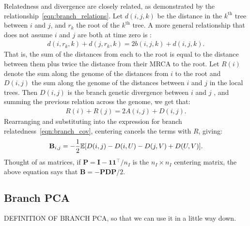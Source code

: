 Relatedness and divergence are closely related,
as demonstrated by the relationship~\eqref{eqn:branch_relations}.
%
Let $d(i,j,k)$ be the distance in the $k^\text{th}$ tree between $i$ and $j$,
and $r_k$ the root of the $k^\text{th}$ tree.
%
A more general relationship that does not assume $i$ and $j$ are both at time zero is
\citep{semple2003phylogenetics}:
%
\begin{align}
    d(i,r_k,k) + d(j,r_k,k) = 2 b(i,j,k) + d(i,j,k) .
\end{align}
%
That is, the sum of the distances from each to the root is
equal to the distance between them plus twice the distance from their MRCA to the root.
%
Let $R(i)$ denote the sum along the genome of the distances from $i$ to the root and
$D(i,j)$ the sum along the genome of the distances between $i$ and $j$ in the local trees.
%
Then $D(i,j)$ is the branch genetic divergence between $i$ and $j$ \citep{ralph2020efficiently},
and summing the previous relation across the genome, we get that:
%
\begin{align} \label{eqn:divergence_relatedness}
    R(i) + R(j) = 2 A(i,j) + D(i,j) .
\end{align}
%
Rearranging and substituting into the expression for branch relatedness~\eqref{eqn:branch_cov},
centering cancels the terms with $R$, giving:
%
\begin{align*}
    \mathbf{B}_{i,j} = - \frac{1}{2} \mathbb{E}[D(i,j) - D(i,U) - D(j,V) + D(U,V)] .
\end{align*}
%
Thought of as matrices, if $\mathbf{P}=\mathbf{I} - \mathbf{1}\mathbf{1}^\intercal / n_I$ is the $n_I \times n_I$
centering matrix, the above equation says that $\mathbf{B} = - \mathbf{P} \mathbf{D} \mathbf{P} / 2$.

\subsection{Branch PCA}
DEFINITION OF BRANCH PCA, so that we can use it in a little way down. 

